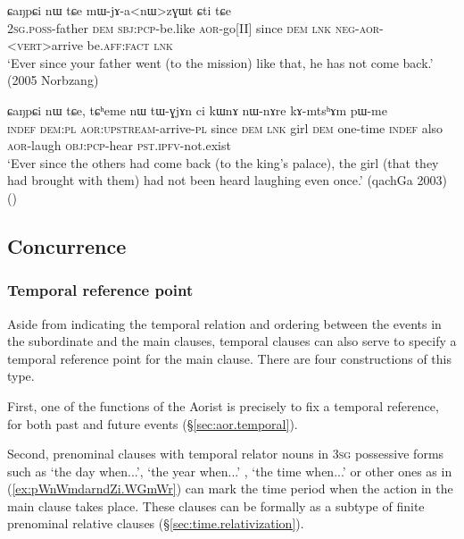 \begin{exe}
\ex \label{ex:jari.CaNpCi} 
 ɕaŋpɕi nɯ tɕe mɯ-jɤ-a<nɯ>zɣɯt ɕti tɕe \\
\textsc{2sg}.\textsc{poss}-father \textsc{dem} \textsc{sbj}:\textsc{pcp}-be.like \textsc{aor}-go[II] since \textsc{dem} \textsc{lnk} \textsc{neg}-\textsc{aor}-<\textsc{vert}>arrive be.\textsc{aff}:\textsc{fact} \textsc{lnk} \\
\glt `Ever since your father went (to the mission) like that, he has not come back.' (2005 Norbzang)
\end{exe}  

\begin{exe}
\ex \label{ex:lazGWtnW.CaNpCi} 
 ɕaŋpɕi nɯ tɕe, tɕʰeme nɯ tɯ-ɣjɤn ci kɯnɤ nɯ-nɤre kɤ-mtsʰɤm pɯ-me \\
\textsc{indef} \textsc{dem}:\textsc{pl} \textsc{aor}:\textsc{upstream}-arrive-\textsc{pl} since \textsc{dem} \textsc{lnk} girl \textsc{dem} one-time \textsc{indef} also \textsc{aor}-laugh \textsc{obj}:\textsc{pcp}-hear \textsc{pst}.\textsc{ipfv}-not.exist \\
\glt `Ever since the others had come back (to the king's palace), the girl (that they had brought with them) had not been heard laughing even once.' (qachGa 2003)
()
\end{exe}  

 
\subsection{Concurrence}

\subsubsection{Temporal reference point} \label{sec:temporal.reference}
Aside from indicating the temporal relation and ordering between the events in the subordinate and the main clauses, temporal clauses can also serve to specify a temporal reference point for the main clause. There are four constructions of this type.

First, one of the functions of the Aorist is precisely to fix a temporal reference, for both past and future events (§\ref{sec:aor.temporal}). 

Second, prenominal clauses with temporal relator nouns in \textsc{3sg} possessive forms such as   `the day when...',  `the year when...' ,  `the time when...' or other ones as in (\ref{ex:pWnWmdarndZi.WGmWr}) can mark the time period when the action in the main clause takes place. These  clauses can be formally as a subtype of finite prenominal relative clauses (§\ref{sec:time.relativization}).
 
